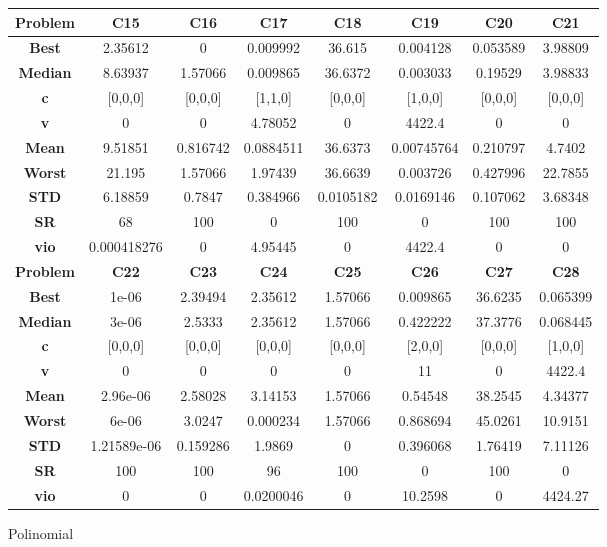 \documentclass{IEEEtran}
\begin{document}
\begin{center}
\begin{tabular}{|c|c|c|c|c|c|c|c|}
    \hline 
    \hline 
    \textbf{Problem} & \textbf{C15} & \textbf{C16} & \textbf{C17} & \textbf{C18} & \textbf{C19} & \textbf{C20} & \textbf{C21} \\ 
    \hline\hline 
    \textbf{Best} & 2.35612 & 0 & 0.009992 & 36.615 & 0.004128 & 0.053589 & 3.98809\\ 
    \textbf{Median} & 8.63937 & 1.57066 & 0.009865 & 36.6372 & 0.003033 & 0.19529 & 3.98833\\ 
    \textbf{c} & [0,0,0] & [0,0,0] & [1,1,0] & [0,0,0] & [1,0,0] & [0,0,0] & [0,0,0]\\ 
    \textbf{v} & 0 & 0 & 4.78052 & 0 & 4422.4 & 0 & 0\\ 
    \textbf{Mean} & 9.51851 & 0.816742 & 0.0884511 & 36.6373 & 0.00745764 & 0.210797 & 4.7402\\ 
    \textbf{Worst} & 21.195 & 1.57066 & 1.97439 & 36.6639 & 0.003726 & 0.427996 & 22.7855\\ 
    \textbf{STD} & 6.18859 & 0.7847 & 0.384966 & 0.0105182 & 0.0169146 & 0.107062 & 3.68348\\ 
    \textbf{SR} & 68 & 100 & 0 & 100 & 0 & 100 & 100\\ 
    \textbf{vio} & 0.000418276 & 0 & 4.95445 & 0 & 4422.4 & 0 & 0\\ 
    \hline 
    \hline 
    \textbf{Problem} & \textbf{C22} & \textbf{C23} & \textbf{C24} & \textbf{C25} & \textbf{C26} & \textbf{C27} & \textbf{C28} \\ 
    \hline\hline 
    \textbf{Best} & 1e-06 & 2.39494 & 2.35612 & 1.57066 & 0.009865 & 36.6235 & 0.065399\\ 
    \textbf{Median} & 3e-06 & 2.5333 & 2.35612 & 1.57066 & 0.422222 & 37.3776 & 0.068445\\ 
    \textbf{c} & [0,0,0] & [0,0,0] & [0,0,0] & [0,0,0] & [2,0,0] & [0,0,0] & [1,0,0]\\ 
    \textbf{v} & 0 & 0 & 0 & 0 & 11 & 0 & 4422.4\\ 
    \textbf{Mean} & 2.96e-06 & 2.58028 & 3.14153 & 1.57066 & 0.54548 & 38.2545 & 4.34377\\ 
    \textbf{Worst} & 6e-06 & 3.0247 & 0.000234 & 1.57066 & 0.868694 & 45.0261 & 10.9151\\ 
    \textbf{STD} & 1.21589e-06 & 0.159286 & 1.9869 & 0 & 0.396068 & 1.76419 & 7.11126\\ 
    \textbf{SR} & 100 & 100 & 96 & 100 & 0 & 100 & 0\\ 
    \textbf{vio} & 0 & 0 & 0.0200046 & 0 & 10.2598 & 0 & 4424.27\\ 
    \hline 
  \end{tabular}
\end{center}
\newpage
Polinomial\\ \\
\end{document}
